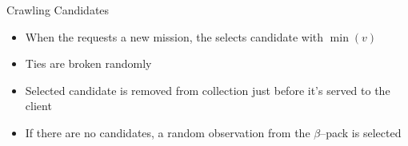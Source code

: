 \begin{frame}{Crawling Candidates}
    \begin{itemize}
        \item When the \mlblinkui requests a new mission, the \mlblinkapi selects candidate with $\min(v)$
        \item Ties are broken randomly
        \item Selected candidate is removed from collection just before it's served to the client
        \item If there are no candidates, a random observation from the $\beta$--pack is selected
    \end{itemize}
\end{frame}